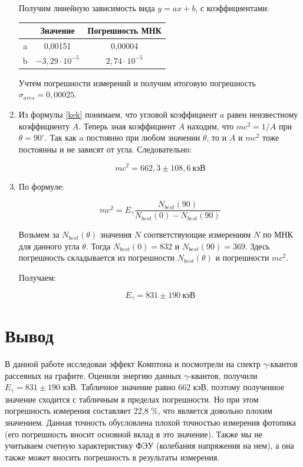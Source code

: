 \documentclass[a4paper, 12pt]{article}%
\begin{document}
\begin{enumerate}
Получим линейную зависимость вида $y = ax + b$, с коэффициентами:

\begin{center}
\begin{tabular}{|c|c|c|}
\hline 
 & Значение & Погрешность МНК \\ 
\hline 
a & 0,00151 & 0,00004 \\ 
\hline 
b & $-3,29 \cdot 10^{-5}$ & $2,74 \cdot 10^{-5}$ \\ 
\hline 
\end{tabular} 
\end{center}

Учтем погрешности измерений и получим итоговую погрешность $\sigma_{a res} = 0,00025$.

\item Из формулы \eqref{kek} понимаем, что угловой коэффициент $a$ равен неизвестному коэффициенту $A$. Теперь зная коэффициент $A$ находим, что $mc^2 = 1/A$ при $\theta = 90^{\circ}$. Так как $a$ постоянно при любом значении $\theta$, то и $A$ и $mc^2$ тоже постоянны и не зависят от угла. Следовательно:

\[mc^2 = 662,3 \pm 108,6 \: \text{кэВ}\]

\item По формуле:

\begin{equation}\label{gamma_energy}
mc^2 = E_{\gamma}\frac{N_{best}(90)}{N_{best}(0) - N_{best}(90)}
\end{equation}

Возьмем за $N_{best}(\theta)$ значения $N$ соответствующие измерениям $N$ по МНК для данного угла $\theta$. Тогда $N_{best}(0) = 832$ и $N_{best}(90) = 369$. Здесь погрешность складывается из погрешности $N_{best}(\theta)$ и погрешности $mc^2$.

Получаем:

\[E_{\gamma} = 831 \pm 190 \: \text{кэВ}\]

\end{enumerate}

\section{Вывод}

В данной работе исследоваи эффект Комптона и посмотрели на спектр $\gamma$-квантов рассеяных на графите. Оценили энергию данных $\gamma$-квантов, получили $E_{\gamma} = 831 \pm 190$ кэВ. Табличное значение равно 662 кэВ, поэтому полученное значение сходится с табличным в пределах погрешности. Но при этом погрешность измерения составляет 22,8 $\%$, что является довольно плохим значением. Данная точность обусловлена плохой точностью измерения фотопика (его погрешность вносит основной вклад в это значение). Также мы не учитываем счетную характеристику ФЭУ (колебания напряжения на нем), а она также может вносить погрешность в результаты измерения.
\end{document}
